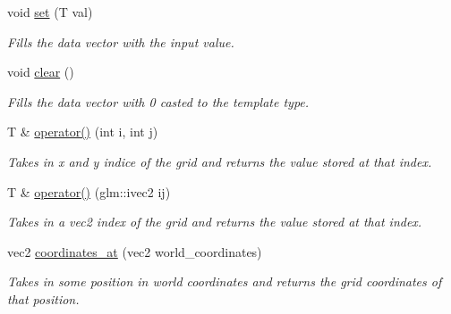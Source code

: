 \begin{DoxyCompactItemize}
\mbox{\label{structArray2_ad264d90ac5d4de34e9bbc214810e169a}} 
void \mbox{\hyperlink{structArray2_ad264d90ac5d4de34e9bbc214810e169a}{set}} (T val)
\begin{DoxyCompactList}\small\item\em Fills the data vector with the input value. \end{DoxyCompactList}\item 
\mbox{\label{structArray2_a8b7caea81764b7ae00e28fb9aa0e23f4}} 
void \mbox{\hyperlink{structArray2_a8b7caea81764b7ae00e28fb9aa0e23f4}{clear}} ()
\begin{DoxyCompactList}\small\item\em Fills the data vector with 0 casted to the template type. \end{DoxyCompactList}\item 
T \& \mbox{\hyperlink{structArray2_a8a89f0623dc0e116e4dc14b0b77b769e}{operator()}} (int i, int j)
\begin{DoxyCompactList}\small\item\em Takes in x and y indice of the grid and returns the value stored at that index. \end{DoxyCompactList}\item 
T \& \mbox{\hyperlink{structArray2_a3e1321aba8d5072af7fcffe56198b99d}{operator()}} (glm\+::ivec2 ij)
\begin{DoxyCompactList}\small\item\em Takes in a vec2 index of the grid and returns the value stored at that index. \end{DoxyCompactList}\item 
vec2 \mbox{\hyperlink{structArray2_afd1e9be811a27a30290d244fe8fd0e47}{coordinates\+\_\+at}} (vec2 world\+\_\+coordinates)
\begin{DoxyCompactList}\small\item\em Takes in some position in world coordinates and returns the {\itshape grid} coordinates of that position. \end{DoxyCompactList}\end{DoxyCompactItemize}
